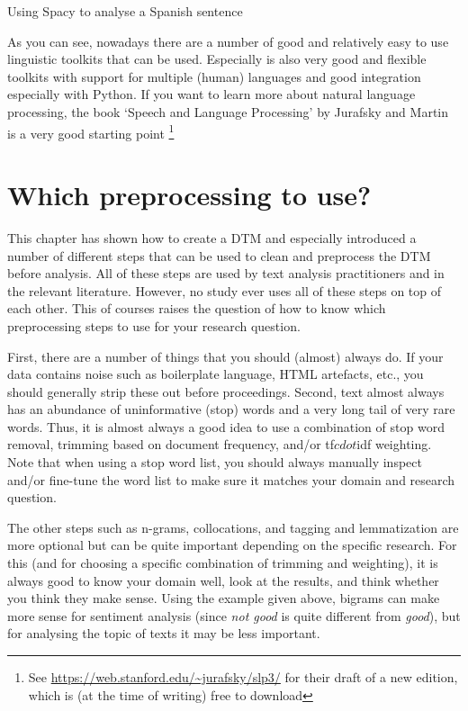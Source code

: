 \begin{ccsexample}
  \caption{Using Spacy to analyse a Spanish sentence}\label{ex:spacy}
\end{ccsexample}

As you can see, nowadays there are a number of good and relatively easy to use linguistic toolkits that can be used.
Especially  \citep{stanza} is also very good and flexible toolkits with support for multiple (human) languages and good integration especially with Python.
If you want to learn more about natural language processing, the book `Speech and Language Processing' by Jurafsky and Martin is a very good starting point \citep{jurafsky}\footnote{See \url{https://web.stanford.edu/~jurafsky/slp3/} for their draft of a new edition, which is (at the time of writing) free to download}


\section{Which preprocessing to use?}

This chapter has shown how to create a DTM and especially introduced a number of different steps that can be used to clean and preprocess the DTM before analysis.
All of these steps are used by text analysis practitioners and in the relevant literature.
However, no study ever uses all of these steps on top of each other.
This of courses raises the question of how to know which preprocessing steps to use for your research question.

First, there are a number of things that you should (almost) always do.
If your data contains noise such as boilerplate language, HTML artefacts, etc., you should generally strip these out before proceedings.
Second, text almost always has an abundance of uninformative (stop) words and a very long tail of very rare words.
Thus, it is almost always a good idea to use a combination of stop word removal, trimming based on document frequency, and/or tf$cdot$idf weighting.
Note that when using a stop word list, you should always manually inspect and/or fine-tune the word list to make sure it matches your domain and research question.

The other steps such as n-grams, collocations, and tagging and lemmatization are more optional but can be quite important depending on the specific research.
For this (and for choosing a specific combination of trimming and weighting), it is always good to know your domain well, look at the results, and think whether you think they make sense.
Using the example given above, bigrams can make more sense for sentiment analysis (since \emph{not good} is quite different from \emph{good}),
but for analysing the topic of texts it may be less important.

